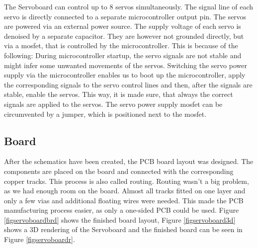 \documentclass[a4paper
               ,10pt
               ,DIV=10 %
               ,BCOR=0.3cm
               ,pagesize %
               ,headings=small
               ,bibtotoc
               ]
               {scrartcl}
\begin{document}
The Servoboard can control up to 8 servos simultaneously.
The signal line of each servo is directly connected to a separate microcontroller output pin.
The servos are powered via an external power source.
The supply voltage of each servo is denoised by a separate capacitor.
They are however not grounded directly, but via a mosfet, that is controlled by the microcontroller.
This is because of the following:
During microcontroller startup, the servo signals are not stable and might infer some unwanted movements of the servos.
Switching the servo power supply via the microcontroller enables us to boot up the microcontroller, apply the corresponding signals to the servo control lines and then, after the signals are stable, enable the servos.
This way, it is made sure, that always the correct signals are applied to the servos.
The servo power supply mosfet can be circumvented by a jumper, which is positioned next to the mosfet.

\subsection{Board}
After the schematics have been created, the PCB board layout was designed.
The components are placed on the board and connected with the corresponding copper tracks.
This process is also called routing.
Routing wasn't a big problem, as we had enough room on the board.
Almost all tracks fitted on one layer and only a few vias and additional floating wires were needed.
This made the PCB manufacturing process easier, as only a one-sided PCB could be used.
Figure \ref{figservoboardbrd} shows the finished board layout, Figure \ref{figservoboard3d} shows a 3D rendering of the Servoboard and the finished board can be seen in Figure \ref{figservoboardr}.
\end{document}
